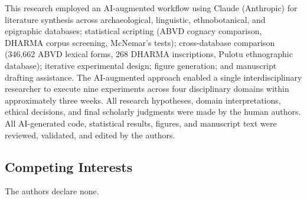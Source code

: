 \documentclass[12pt,a4paper]{article}
\begin{document}
This research employed an AI-augmented workflow using Claude (Anthropic) for literature synthesis across archaeological, linguistic, ethnobotanical, and epigraphic databases; statistical scripting (ABVD cognacy comparison, DHARMA corpus screening, McNemar's tests); cross-database comparison (346,662 ABVD lexical forms, 268 DHARMA inscriptions, Pulotu ethnographic database); iterative experimental design; figure generation; and manuscript drafting assistance. The AI-augmented approach enabled a single interdisciplinary researcher to execute nine experiments across four disciplinary domains within approximately three weeks. All research hypotheses, domain interpretations, ethical decisions, and final scholarly judgments were made by the human authors. All AI-generated code, statistical results, figures, and manuscript text were reviewed, validated, and edited by the authors.

\subsection*{Competing Interests}

The authors declare none.
\end{document}
